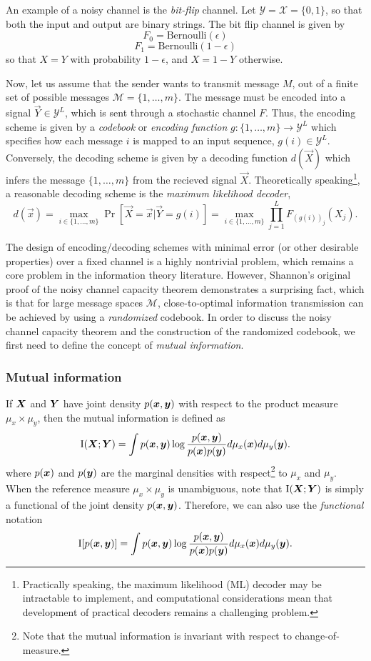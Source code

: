An example of a noisy channel is the \emph{bit-flip} channel.
Let $\mathcal{Y} = \mathcal{X} = \{0,1\}$, so that both the input and output are binary strings.
The bit flip channel is given by
\[
F_0 = \text{Bernoulli}(\epsilon)
\]
\[
F_1 = \text{Bernoulli}(1-\epsilon)
\]
so that $X = Y$ with probability $1-\epsilon$, and $X = 1-Y$
otherwise.

Now, let us assume that the sender wants to transmit message $M$, out
of a finite set of possible messages $\mathcal{M} = \{1,\hdots, m\}$.
The message must be encoded into a signal $\vec{Y} \in \mathcal{Y}^L$,
which is sent through a stochastic channel $F$.  Thus, the encoding
scheme is given by a \emph{codebook} or \emph{encoding function} $g:
\{1,\hdots, m\} \to \mathcal{Y}^L$ which specifies how each message
$i$ is mapped to an input sequence, $g(i) \in \mathcal{Y}^L$.
Conversely, the decoding scheme is given by a decoding function
$d(\vec{X})$ which infers the message $\{1,\hdots, m\}$ from the
recieved signal $\vec{X}$.  Theoretically
speaking\footnote{Practically speaking, the maximum likelihood (ML)
  decoder may be intractable to implement, and computational
  considerations mean that development of practical decoders remains a
  challenging problem.}, a reasonable decoding scheme is the
\emph{maximum likelihood decoder},
\[
d(\vec{x}) = \max_{i \in \{1,\hdots, m\}} \Pr[\vec{X} = \vec{x}| \vec{Y} = g(i)] = \max_{i \in \{1,\hdots, m\}} \prod_{j=1}^L F_{(g(i))_j}(X_j).
\]

The design of encoding/decoding schemes with minimal error (or other
desirable properties) over a fixed channel is a highly nontrivial
problem, which remains a core problem in the information theory
literature.  However, Shannon's original proof of the noisy channel
capacity theorem demonstrates a surprising fact, which is that for
large message spaces $\mathcal{M}$, close-to-optimal information
transmission can be achieved by using a \emph{randomized} codebook.
In order to discuss the noisy channel capacity theorem and the
construction of the randomized codebook, we first need to define
the concept of \emph{mutual information}.

\subsubsection{Mutual information}

If $\boldsymbol{X}$ and $\boldsymbol{Y}$ have joint density $p(\boldsymbol{x}, \boldsymbol{y})$ with respect to
the product measure $\mu_x \times \mu_y$, then the mutual information
is defined as
\[
\text{I}(\boldsymbol{X};\boldsymbol{Y}) = \int p(\boldsymbol{x}, \boldsymbol{y}) \log \frac{p(\boldsymbol{x}, \boldsymbol{y})}{p(\boldsymbol{x})p(\boldsymbol{y})}d\mu_x(\boldsymbol{x}) d\mu_y(\boldsymbol{y}).
\]
where $p(\boldsymbol{x})$ and $p(\boldsymbol{y})$ are the marginal densities with
respect\footnote{Note that the mutual information is invariant with
  respect to change-of-measure.} to $\mu_x$ and $\mu_y$.  When the
reference measure $\mu_x \times \mu_y$ is unambiguous, note that
$\text{I}(\boldsymbol{X};\boldsymbol{Y})$ is simply a functional of the joint density
$p(\boldsymbol{x}, \boldsymbol{y})$.  Therefore, we can also use the \emph{functional}
notation
\[
\text{I}[p(\boldsymbol{x}, \boldsymbol{y})] = \int p(\boldsymbol{x}, \boldsymbol{y}) \log \frac{p(\boldsymbol{x}, \boldsymbol{y})}{p(\boldsymbol{x})p(\boldsymbol{y})}d\mu_x(\boldsymbol{x}) d\mu_y(\boldsymbol{y}).
\]


